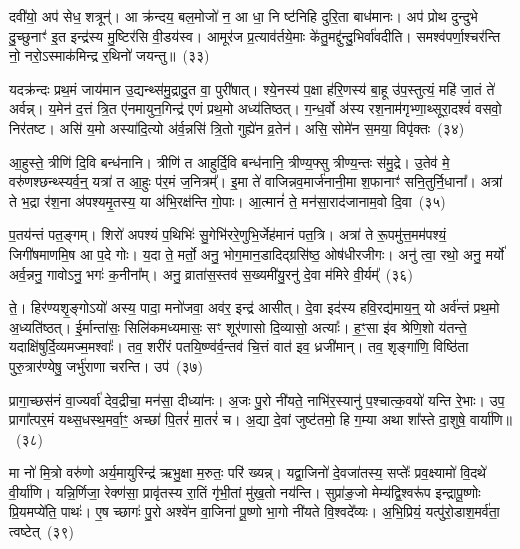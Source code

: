 दवी॑यो॒ अप॑ सेध॒ शत्रून्॑। आ क्र॑न्दय॒ बल॒मोजो॑ न॒ आ धा॒ नि ष्ट॑निहि दुरि॒ता बाध॑मानः। अप॑ प्रोथ दुन्दुभे दु॒च्छुनाꣳ॑ इ॒त इन्द्र॑स्य मु॒ष्टिर॑सि वी॒डय॑स्व। आमूर॑ज प्र॒त्याव॑र्तये॒माः के॑तु॒मद्दु॑न्दु॒भिर्वा॑वदीति। समश्व॑पर्णा॒श्चर॑न्ति नो॒ नरो॒\-ऽस्माक॑मिन्द्र र॒थिनो॑ जयन्तु॥~(३३)

{\anuvakamend[{धन्व॑न्महि॒मानं॒ ब्राह्म॑णा॒सो\-ऽदि॑तिः पृथि॒व्याः परि॑ दू॒रादेक॑चत्वारिꣳशच्च}]}%

यदक्र॑न्दः प्रथ॒मं जाय॑मान उ॒द्यन्थ्स॑मु॒द्रादु॒त वा॒ पुरी॑षात्। श्ये॒नस्य॑ प॒क्षा ह॑रि॒णस्य॑ बा॒हू उ॑प॒स्तुत्यं॒ महि॑ जा॒तं ते॑ अर्वन्न्। य॒मेन॑ द॒त्तं त्रि॒त ए॑नमायुन॒गिन्द्र॑ एणं प्रथ॒मो अध्य॑तिष्ठत्। ग॒न्ध॒र्वो अ॑स्य रश॒नाम॑गृभ्णा॒थ्सूरा॒दश्वं॑ वसवो॒ निर॑तष्ट। असि॑ य॒मो अस्या॑दि॒त्यो अ॑र्व॒न्नसि॑ त्रि॒तो गुह्ये॑न व्र॒तेन॑। असि॒ सोमे॑न स॒मया॒ विपृ॑क्तः~(३४)

आ॒हुस्ते॒ त्रीणि॑ दि॒वि बन्ध॑नानि। त्रीणि॑ त आहुर्दि॒वि बन्ध॑नानि॒ त्रीण्य॒फ्सु त्रीण्य॒न्तः स॑मु॒द्रे। उ॒तेव॑ मे॒ वरु॑णश्छन्थ्स्यर्व॒न्॒ यत्रा॑ त आ॒हुः प॑र॒मं ज॒नित्रम्᳚। इ॒मा ते॑ वाजिन्नव॒मार्ज॑नानी॒मा श॒फानाꣳ॑ सनि॒तुर्नि॒धाना᳚। अत्रा॑ ते भ॒द्रा र॑श॒ना अ॑पश्यमृ॒तस्य॒ या अ॑भि॒रक्ष॑न्ति गो॒पाः। आ॒त्मानं॑ ते॒ मन॑सा॒राद॑जानाम॒वो दि॒वा~(३५)

प॒तय॑न्तं पत॒ङ्गम्। शिरो॑ अपश्यं प॒थिभिः॑ सु॒गेभि॑ररे॒णुभि॒र्जेह॑मानं पत॒त्रि। अत्रा॑ ते रू॒पमु॑त्त॒मम॑पश्यं॒ जिगी॑षमाणमि॒ष आ प॒दे गोः। य॒दा ते॒ मर्तो॒ अनु॒ भोग॒मान॒डादिद्ग्रसि॑ष्ठ॒ ओष॑धीरजीगः। अनु॑ त्वा॒ रथो॒ अनु॒ मर्यो॑ अर्व॒न्ननु॒ गावो\-ऽनु॒ भगः॑ क॒नीना᳚म्। अनु॒ व्राता॑स॒स्तव॑ स॒ख्यमी॑यु॒रनु॑ दे॒वा म॑मिरे वी॒र्यम्᳚~(३६)

ते॒। हिर॑ण्यशृ॒ङ्गो\-ऽयो॑ अस्य॒ पादा॒ मनो॑जवा॒ अव॑र॒ इन्द्र॑ आसीत्। दे॒वा इद॑स्य हवि॒रद्य॑माय॒न्॒ यो अर्व॑न्तं प्रथ॒मो अ॒ध्यति॑ष्ठत्। ई॒र्मान्ता॑सः॒ सिलि॑कमध्यमासः॒ सꣳ शूर॑णासो दि॒व्यासो॒ अत्याः᳚। ह॒ꣳ॒सा इ॑व श्रेणि॒शो य॑तन्ते॒ यदाक्षि॑षुर्दि॒व्यमज्म॒मश्वाः᳚। तव॒ शरी॑रं पतयि॒ष्ण्व॑र्व॒न्तव॑ चि॒त्तं वात॑ इव॒ ध्रजी॑मान्। तव॒ शृङ्गा॑णि॒ विष्ठि॑ता पुरु॒त्रार॑ण्येषु॒ जर्भु॑राणा चरन्ति। उप॑~(३७)

प्रागा॒च्छस॑नं वा॒ज्यर्वा॑ देव॒द्रीचा॒ मन॑सा॒ दीध्या॑नः। अ॒जः पु॒रो नी॑यते॒ नाभि॑र॒स्यानु॑ प॒श्चात्क॒वयो॑ यन्ति रे॒भाः। उप॒ प्रागा᳚त्पर॒मं यथ्स॒धस्थ॒मर्वा॒ꣳ॒ अच्छा॑ पि॒तरं॑ मा॒तरं॑ च। अ॒द्या दे॒वां जुष्ट॑तमो॒ हि ग॒म्या अथा शा᳚स्ते दा॒शुषे॒ वार्या॑णि॥~(३८)

{\anuvakamend[{विपृ॑क्तो दि॒वा वी॒र्य॑मुपैका॒न्नच॑त्वारि॒ꣳ॒शच्च॑}]}%

मा नो॑ मि॒त्रो वरु॑णो अर्य॒मायुरिन्द्र॑ ऋभु॒क्षा म॒रुतः॒ परि॑ ख्यन्न्। यद्वा॒जिनो॑ दे॒वजा॑तस्य॒ सप्तेः᳚ प्रव॒क्ष्यामो॑ वि॒दथे॑ वी॒र्या॑णि। यन्नि॒र्णिजा॒ रेक्ण॑सा॒ प्रावृ॑तस्य रा॒तिं गृ॑भी॒तां मु॑ख॒तो नय॑न्ति। सुप्रा॑ङ॒जो मेम्य॑द्वि॒श्वरू॑प इन्द्रापू॒ष्णोः प्रि॒यमप्ये॑ति॒ पाथः॑। ए॒ष च्छागः॑ पु॒रो अश्वे॑न वा॒जिना॑ पू॒ष्णो भा॒गो नी॑यते वि॒श्वदे᳚व्यः। अ॒भि॒प्रियं॒ यत्पु॑रो॒डाश॒मर्व॑ता॒ त्वष्टेत्~(३९)


